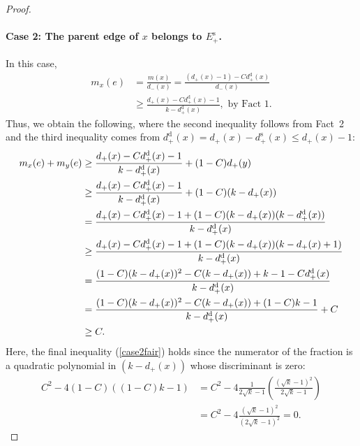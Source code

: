 \documentclass[smallextended]{svjour3}
\newcommand{\es}{\ensuremath{E_{+}^{\text{s}}}\xspace}
\def\dc{d_{+}}
\def\dd{d_{+}^{\text{d}}}
\def\dr{d_{-}}
\def\ds{d_{+}^{\text{s}}}
\begin{document}
\begin{proof}
\paragraph{Case 2: The parent edge of $x$ belongs to $\es$.} 
In this case,
\begin{align*}
m_x(e) & = \frac{m(x)}{\dr(x)} = \frac{(\dc(x)-1)-C\dd(x)}{\dr(x)}\\
       & \geq \frac{\dc(x)-C\dd(x)-1}{k-\dd(x)}, \text{ by  Fact 1.}
\end{align*}
Thus, we obtain the following, where the second inequality follows from Fact~2 and the third inequality comes from $\dd(x) = \dc(x)-\ds(x) \leq \dc(x)-1$:
\begin{align} 
m_x(e) + m_y(e)
&\notag \geq \frac{\dc(x)-C\dd(x)-1}{k-\dd(x)} + (1-C)\dc(y)\\
&\notag \geq \frac{\dc(x)-C\dd(x)-1}{k-\dd(x)} + (1-C)(k-\dc(x))
\\
&\notag = \frac{\dc(x)-C\dd(x)-1 + (1-C)(k-\dc(x))(k-\dd(x))}{k-\dd(x)}\\
&\notag \geq \frac{\dc(x)-C\dd(x)-1 + (1-C)(k-\dc(x))(k-\dc(x)+1)}{k-\dd(x)}\\
&\notag =\frac{(1-C)(k-\dc(x))^2-C(k-\dc(x))+k-1-C\dd(x)}{k-\dd(x)}\\
&\notag=\frac{(1-C)(k-\dc(x))^2-C(k-\dc(x))+(1-C)k-1}{k-\dd(x)}+C\\
&\geq C. \label{case2fair}
\end{align}
Here, the final inequality (\ref{case2fair}) holds since the numerator of the fraction is a quadratic polynomial in $(k-\dc(x))$ whose discriminant is zero: 
\begin{align*}
C^2-4(1-C)((1-C)k-1)&=C^2-4\frac{1}{2\sqrt{k}-1}\left(\frac{(\sqrt{k}-1)^2}{2\sqrt{k}-1}\right)\\
&=C^2-4\frac{(\sqrt{k}-1)^2}{(2\sqrt{k}-1)^2}=0.
\end{align*}


\end{proof}
\end{document}
